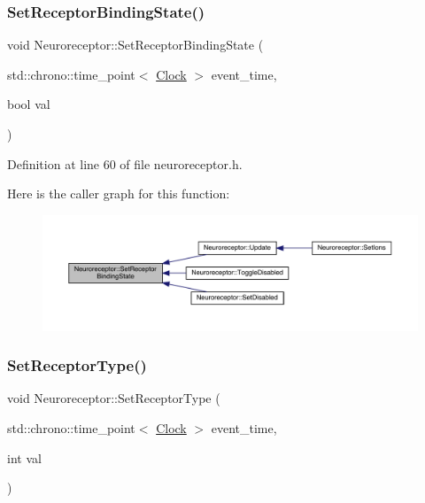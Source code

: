 \subsubsection{\texorpdfstring{Set\+Receptor\+Binding\+State()}{SetReceptorBindingState()}}
{\footnotesize\ttfamily void Neuroreceptor\+::\+Set\+Receptor\+Binding\+State (\begin{DoxyParamCaption}\item[{std\+::chrono\+::time\+\_\+point$<$ \hyperlink{universe_8h_a0ef8d951d1ca5ab3cfaf7ab4c7a6fd80}{Clock} $>$}]{event\+\_\+time,  }\item[{bool}]{val }\end{DoxyParamCaption})\hspace{0.3cm}{\ttfamily [inline]}}



Definition at line 60 of file neuroreceptor.\+h.

Here is the caller graph for this function\+:
\nopagebreak
\begin{figure}[H]
\begin{center}
\leavevmode
\includegraphics[width=350pt]{class_neuroreceptor_a75adddd7e615af57b8f3f841ec25463c_icgraph}
\end{center}
\end{figure}
\mbox{\label{class_neuroreceptor_a0e6e88d6c5b357872f055edbddb54d4c}} 
\subsubsection{\texorpdfstring{Set\+Receptor\+Type()}{SetReceptorType()}}
{\footnotesize\ttfamily void Neuroreceptor\+::\+Set\+Receptor\+Type (\begin{DoxyParamCaption}\item[{std\+::chrono\+::time\+\_\+point$<$ \hyperlink{universe_8h_a0ef8d951d1ca5ab3cfaf7ab4c7a6fd80}{Clock} $>$}]{event\+\_\+time,  }\item[{int}]{val }\end{DoxyParamCaption})\hspace{0.3cm}{\ttfamily [inline]}}



